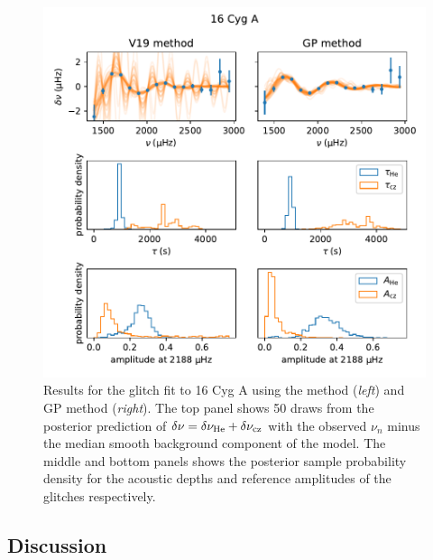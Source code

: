 \begin{figure}[!tbp]
    \centering
    \includegraphics{figures/glitch-16cyga.pdf}
    \caption{Results for the glitch fit to 16 Cyg A using the  method (\emph{left}) and GP method (\emph{right}). The top panel shows 50 draws from the posterior prediction of \(\delta\nu = \delta\nu_{{\mathrm{He}}} + \delta\nu_{{\mathrm{cz}}}\) with the observed \(\nu_n\) minus the median smooth background component of the model. The middle and bottom panels shows the posterior sample probability density for the acoustic depths and reference amplitudes of the glitches respectively.}
    \label{fig:glitch-16cyga}
\end{figure}

\subsection{Discussion}


